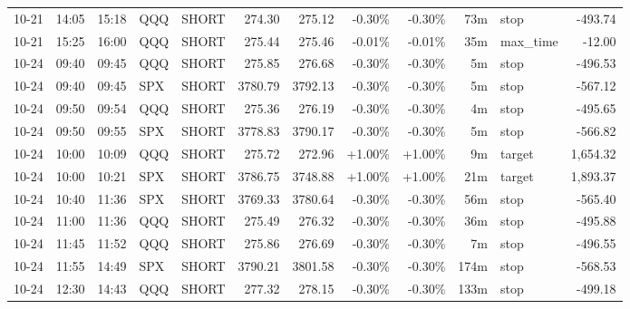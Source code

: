 \documentclass[11pt,a4paper,twoside]{article}
\begin{document}
\begin{center}
\begin{longtable}{>{\color{txtmain}}l l l l l r r r r r >{\color{txtmain}}l r}
10-21 & 14:05 & 15:18 & QQQ & SHORT & 274.30 & 275.12 & \textcolor{lossred}{-0.30\%} & \textcolor{lossred}{-0.30\%} & 73m & stop & \textcolor{lossred}{-493.74} \\
10-21 & 15:25 & 16:00 & QQQ & SHORT & 275.44 & 275.46 & \textcolor{lossred}{-0.01\%} & \textcolor{lossred}{-0.01\%} & 35m & max\_time & \textcolor{lossred}{-12.00} \\
10-24 & 09:40 & 09:45 & QQQ & SHORT & 275.85 & 276.68 & \textcolor{lossred}{-0.30\%} & \textcolor{lossred}{-0.30\%} & 5m & stop & \textcolor{lossred}{-496.53} \\
10-24 & 09:40 & 09:45 & SPX & SHORT & 3780.79 & 3792.13 & \textcolor{lossred}{-0.30\%} & \textcolor{lossred}{-0.30\%} & 5m & stop & \textcolor{lossred}{-567.12} \\
10-24 & 09:50 & 09:54 & QQQ & SHORT & 275.36 & 276.19 & \textcolor{lossred}{-0.30\%} & \textcolor{lossred}{-0.30\%} & 4m & stop & \textcolor{lossred}{-495.65} \\
10-24 & 09:50 & 09:55 & SPX & SHORT & 3778.83 & 3790.17 & \textcolor{lossred}{-0.30\%} & \textcolor{lossred}{-0.30\%} & 5m & stop & \textcolor{lossred}{-566.82} \\
10-24 & 10:00 & 10:09 & QQQ & SHORT & 275.72 & 272.96 & \textcolor{wingreen}{+1.00\%} & \textcolor{wingreen}{+1.00\%} & 9m & target & \textcolor{wingreen}{1,654.32} \\
10-24 & 10:00 & 10:21 & SPX & SHORT & 3786.75 & 3748.88 & \textcolor{wingreen}{+1.00\%} & \textcolor{wingreen}{+1.00\%} & 21m & target & \textcolor{wingreen}{1,893.37} \\
10-24 & 10:40 & 11:36 & SPX & SHORT & 3769.33 & 3780.64 & \textcolor{lossred}{-0.30\%} & \textcolor{lossred}{-0.30\%} & 56m & stop & \textcolor{lossred}{-565.40} \\
10-24 & 11:00 & 11:36 & QQQ & SHORT & 275.49 & 276.32 & \textcolor{lossred}{-0.30\%} & \textcolor{lossred}{-0.30\%} & 36m & stop & \textcolor{lossred}{-495.88} \\
10-24 & 11:45 & 11:52 & QQQ & SHORT & 275.86 & 276.69 & \textcolor{lossred}{-0.30\%} & \textcolor{lossred}{-0.30\%} & 7m & stop & \textcolor{lossred}{-496.55} \\
10-24 & 11:55 & 14:49 & SPX & SHORT & 3790.21 & 3801.58 & \textcolor{lossred}{-0.30\%} & \textcolor{lossred}{-0.30\%} & 174m & stop & \textcolor{lossred}{-568.53} \\
10-24 & 12:30 & 14:43 & QQQ & SHORT & 277.32 & 278.15 & \textcolor{lossred}{-0.30\%} & \textcolor{lossred}{-0.30\%} & 133m & stop & \textcolor{lossred}{-499.18} \\

\end{longtable}
\end{center}
\end{document}
